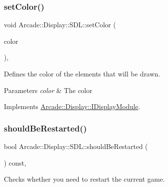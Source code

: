 \mbox{\label{classArcade_1_1Display_1_1SDL_a857d2a5ab8266a1e11f528f398e3f55d}} 
\subsubsection{\texorpdfstring{setColor()}{setColor()}}
{\footnotesize\ttfamily void Arcade\+::\+Display\+::\+S\+D\+L\+::set\+Color (\begin{DoxyParamCaption}\item[{\mbox{\hyperlink{classArcade_1_1Display_1_1IDisplayModule_ae0a776be9163d096051c522e21c007b2}{I\+Display\+Module\+::\+Colors}}}]{color }\end{DoxyParamCaption})\hspace{0.3cm}{\ttfamily [final]}, {\ttfamily [virtual]}}



Defines the color of the elements that will be drawn. 


\begin{DoxyParams}{Parameters}
{\em color} & The color \\
\hline
\end{DoxyParams}


Implements \mbox{\hyperlink{classArcade_1_1Display_1_1IDisplayModule_a9f81148f93a249d6fc91307819911b4e}{Arcade\+::\+Display\+::\+I\+Display\+Module}}.

\mbox{\label{classArcade_1_1Display_1_1SDL_aaeeb1aa505c0eab3c8b5c34265c89845}} 
\subsubsection{\texorpdfstring{shouldBeRestarted()}{shouldBeRestarted()}}
{\footnotesize\ttfamily bool Arcade\+::\+Display\+::\+S\+D\+L\+::should\+Be\+Restarted (\begin{DoxyParamCaption}{ }\end{DoxyParamCaption}) const\hspace{0.3cm}{\ttfamily [final]}, {\ttfamily [virtual]}}



Checks whether you need to restart the current game. 

